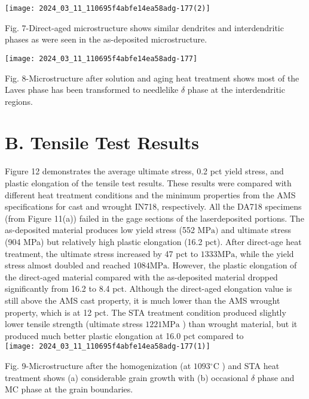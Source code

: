 \documentclass[10pt]{article}
\begin{document}
\begin{center}
\texttt{[image: 2024\_03\_11\_110695f4abfe14ea58adg-177(2)]}
\end{center}

Fig. 7-Direct-aged microstructure shows similar dendrites and interdendritic phases as were seen in the as-deposited microstructure.

\begin{center}
\texttt{[image: 2024\_03\_11\_110695f4abfe14ea58adg-177]}
\end{center}

Fig. 8-Microstructure after solution and aging heat treatment shows most of the Laves phase has been transformed to needlelike $\delta$ phase at the interdendritic regions.

\section*{B. Tensile Test Results}
Figure 12 demonstrates the average ultimate stress, 0.2 pct yield stress, and plastic elongation of the tensile test results. These results were compared with different heat treatment conditions and the minimum properties from the AMS specifications for cast and wrought IN718, respectively. All the DA718 specimens (from Figure 11(a)) failed in the gage sections of the laserdeposited portions. The as-deposited material produces low yield stress (552 $\mathrm{MPa})$ and ultimate stress (904 MPa) but relatively high plastic elongation (16.2 pct). After direct-age heat treatment, the ultimate stress increased by 47 pct to $1333 \mathrm{MPa}$, while the yield stress almost doubled and reached $1084 \mathrm{MPa}$. However, the plastic elongation of the direct-aged material compared with the as-deposited material dropped significantly from 16.2 to 8.4 pct. Although the direct-aged elongation value is still above the AMS cast property, it is much lower than the AMS wrought property, which is at 12 pct. The STA treatment condition produced slightly lower tensile strength (ultimate stress $1221 \mathrm{MPa}$ ) than wrought material, but it produced much better plastic elongation at 16.0 pct compared to\\
\texttt{[image: 2024\_03\_11\_110695f4abfe14ea58adg-177(1)]}

Fig. 9-Microstructure after the homogenization (at $1093{ }^{\circ} \mathrm{C}$ ) and STA heat treatment shows (a) considerable grain growth with (b) occasional $\delta$ phase and MC phase at the grain boundaries.
\end{document}
